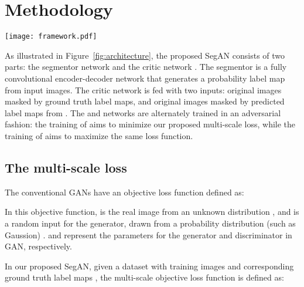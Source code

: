\documentclass[twocolumn]{svjour3}
\begin{document}
\section{Methodology} \label{methods}


\begin{figure*}[tb]
    \centerline{
    \texttt{[image: framework.pdf]}}
\caption{The architecture of the proposed SegAN with segmentor and critic networks.  convolutional layers with stride  (S2) and the corresponding number of feature maps (e.g., N64) are used for encoding, while image resize layers with a factor of  (R2) and  convolutional layers with stride  are used for decoding. Masked images are calculated by pixel-wise multiplication of a label map and (the multiple channels of) an input image. Note that, although only one label map (for whole tumor segmentation) is illustrated here, multiple label maps (e.g. also for tumor core and Gd-enhanced tumor core) can be generated by the segmentor in one path. }
\label{fig:architecture}
		\end{figure*}


As illustrated in Figure~\ref{fig:architecture}, the proposed SegAN consists of two parts: the segmentor network  and the critic network .
The segmentor is a fully convolutional encoder-decoder network that generates a probability label map from input images.
The critic network is fed with two inputs: original images masked by ground truth label maps, and original images masked by predicted label maps from .
The  and  networks are alternately trained in an adversarial fashion: the training of  aims to minimize our proposed multi-scale  loss, while the training of  aims to maximize the same loss function.

\vspace{-8pt}
\subsection{The multi-scale  loss}

The conventional GANs \cite{goodfellow2014generative} have an objective loss function defined as:


In this objective function,  is the real image from an unknown distribution , and  is a random input for the generator, drawn from a probability distribution (such as Gaussion) .  and  represent the parameters for the generator and discriminator in GAN, respectively.

In our proposed SegAN, given a dataset with  training images  and corresponding ground truth label maps , the multi-scale objective loss function  is defined as:
\end{document}
